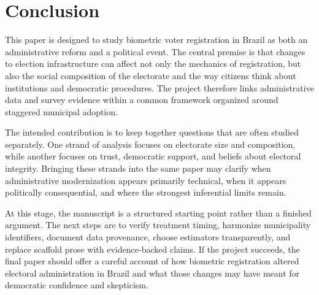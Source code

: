 \section{Conclusion}
\label{sec:conclusion}


This paper is designed to study biometric voter registration in Brazil as both an administrative reform and a political event. The central premise is that changes to election infrastructure can affect not only the mechanics of registration, but also the social composition of the electorate and the way citizens think about institutions and democratic procedures. The project therefore links administrative data and survey evidence within a common framework organized around staggered municipal adoption.

The intended contribution is to keep together questions that are often studied separately. One strand of analysis focuses on electorate size and composition, while another focuses on trust, democratic support, and beliefs about electoral integrity. Bringing these strands into the same paper may clarify when administrative modernization appears primarily technical, when it appears politically consequential, and where the strongest inferential limits remain.

At this stage, the manuscript is a structured starting point rather than a finished argument. The next steps are to verify treatment timing, harmonize municipality identifiers, document data provenance, choose estimators transparently, and replace scaffold prose with evidence-backed claims. If the project succeeds, the final paper should offer a careful account of how biometric registration altered electoral administration in Brazil and what those changes may have meant for democratic confidence and skepticism.
